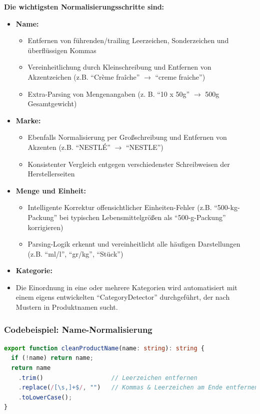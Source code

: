 \documentclass[12pt, a4paper]{report} %
\begin{document}
\textbf{Die wichtigsten Normalisierungsschritte sind:}

\begin{itemize}
    \item \textbf{Name:}
      \begin{itemize}
        \item Entfernen von führenden/trailing Leerzeichen, Sonderzeichen und überflüssigen Kommas
        \item Vereinheitlichung durch Kleinschreibung und Entfernen von Akzentzeichen (z.B. "`Crème fraîche"' $\to$ "`creme fraiche"')
        \item Extra-Parsing von Mengenangaben (z. B. "`10 x 50g"' $\to$ 500g Gesamtgewicht)
      \end{itemize}
    \item \textbf{Marke:}
      \begin{itemize}
        \item Ebenfalls Normalisierung per Großschreibung und Entfernen von Akzenten (z.B. "`NESTLÉ"' $\to$ "`NESTLE"')
        \item Konsistenter Vergleich entgegen verschiedenster Schreibweisen der Herstellerseiten
      \end{itemize}
    \item \textbf{Menge und Einheit:}
      \begin{itemize}
        \item Intelligente Korrektur offensichtlicher Einheiten-Fehler (z.B. "`500-kg-Packung"' bei typischen Lebensmittelgrößen als "`500-g-Packung"' korrigieren)
        \item Parsing-Logik erkennt und vereinheitlicht alle häufigen Darstellungen (z.B. "`ml/l"', "`gr/kg"', "`Stück"')
      \end{itemize}
    \item \textbf{Kategorie:}
      \item Die Einordnung in eine oder mehrere Kategorien wird automatisiert mit einem eigens entwickelten "`CategoryDetector"' durchgeführt, der nach Mustern in Produktnamen sucht.
\end{itemize}

\subsubsection{Codebeispiel: Name-Normalisierung}
\begin{lstlisting}[language=TypeScript, caption={Vereinheitlichung von Produktnamen}]
export function cleanProductName(name: string): string {
  if (!name) return name;
  return name
    .trim()                   // Leerzeichen entfernen
    .replace(/[\s,]+$/, "")   // Kommas & Leerzeichen am Ende entfernen
    .toLowerCase();
}
\end{lstlisting}
\end{document}
